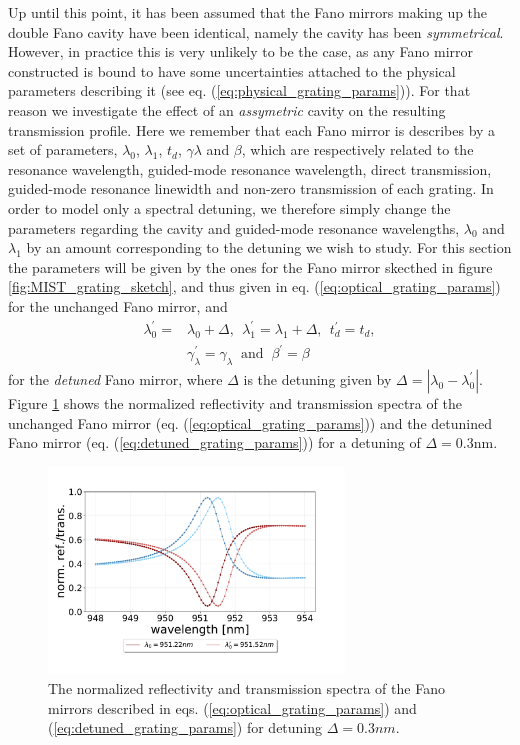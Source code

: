 Up until this point, it has been assumed that the Fano mirrors making up the double Fano cavity have been identical, namely the cavity has been \emph{symmetrical}. However, in practice this is very unlikely to be the case, as any Fano mirror constructed is bound to have some uncertainties attached to the physical parameters describing it (see eq. (\ref{eq:physical_grating_params})). For that reason we investigate the effect of an \emph{assymetric} cavity on the resulting transmission profile. Here we remember that each Fano mirror is describes by a set of parameters, $\lambda_0$, $\lambda_1$, $t_d$, $\gamma \lambda$ and $\beta$, which are respectively related to the resonance wavelength, guided-mode resonance wavelength, direct transmission, guided-mode resonance linewidth and non-zero transmission of each grating. In order to model only a spectral detuning, we therefore simply change the parameters regarding the cavity and guided-mode resonance wavelengths, $\lambda_0$ and $\lambda_1$ by an amount corresponding to the detuning we wish to study. For this section the parameters will be given by the ones for the Fano mirror skecthed in figure \ref{fig:MIST_grating_sketch}, and thus given in eq. (\ref{eq:optical_grating_params}) for the unchanged Fano mirror, and
\begin{equation}
    \begin{split}
    \lambda_0^{\prime} = &\lambda_0 + \Delta,\:\: \lambda_1^{\prime} = \lambda_1 + \Delta,\:\: t_d^{\prime} = t_d,\\ &\gamma_{\lambda}^{\prime} = \gamma_{\lambda}\: \text{ and }\: \beta^{\prime} = \beta
    \end{split}
    \label{eq:detuned_grating_params}
\end{equation}
for the \emph{detuned} Fano mirror, where $\Delta$ is the detuning given by $\Delta = |\lambda_0 - \lambda_0^{\prime}|$. Figure \ref{fig:detuned_grating_spectra} shows the normalized reflectivity and transmission spectra of the unchanged Fano mirror (eq. (\ref{eq:optical_grating_params})) and the detunined Fano mirror (eq. (\ref{eq:detuned_grating_params})) for a detuning of $\Delta = 0.3$nm.

\begin{figure}[h!]
    \centering
    \includegraphics[width=0.7\textwidth]{figures/detuned_grating_spectra.pdf}
    \caption{The normalized reflectivity and transmission spectra of the Fano mirrors described in eqs. (\ref{eq:optical_grating_params}) and (\ref{eq:detuned_grating_params}) for detuning $\Delta = 0.3nm$.}
    \label{fig:detuned_grating_spectra}
\end{figure}

